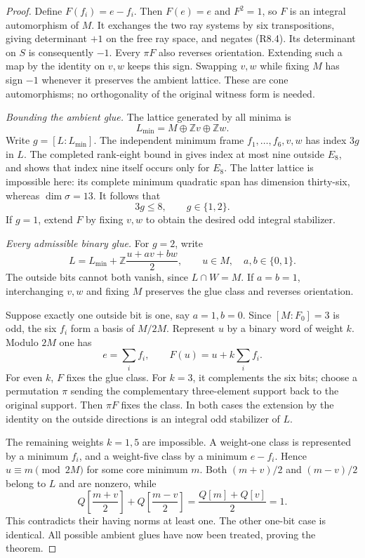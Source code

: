 \documentclass[11pt,a4paper]{article}
\theoremstyle{definition}
\begin{document}
\begin{proof}
Define $F(f_i)=e-f_i$. Then $F(e)=e$ and $F^2=1$, so $F$ is an
integral automorphism of $M$. It exchanges the two ray systems by
six transpositions, giving determinant $+1$ on the free ray space,
and negates (R8.4). Its determinant on $S$ is consequently $-1$.
Every $\pi F$ also reverses orientation. Extending such a map by
the identity on $v,w$ keeps this sign. Swapping $v,w$ while fixing
$M$ has sign $-1$ whenever it preserves the ambient lattice.
These are cone automorphisms; no orthogonality of the original
witness form is needed.

\medskip\noindent
\emph{Bounding the ambient glue.}
The lattice generated by all minima is
\[
                  L_{\min}=M\oplus\mathbb Zv\oplus\mathbb Zw.
\]
Write $g=[L:L_{\min}]$. The independent minimum frame
$f_1,\ldots,f_6,v,w$ has index $3g$ in $L$.
The completed rank-eight bound in
\cite[appendix, pp.~6--8]{MartinetIndexErrata2014} gives index at
most nine outside $E_8$, and
\cite[Theorem~10.1]{MartinetIndex2001} shows that index nine itself
occurs only for $E_8$. The latter lattice is impossible here: its
complete minimum quadratic span has dimension thirty-six, whereas
$\dim\sigma=13$. It follows that
\[
                           3g\leq8,
                  \qquad g\in\{1,2\}.                  \tag{R8.5}
\]
If $g=1$, extend $F$ by fixing $v,w$ to obtain the desired odd
integral stabilizer.

\medskip\noindent
\emph{Every admissible binary glue.}
For $g=2$, write
\[
 L=L_{\min}+\mathbb Z\frac{u+av+bw}{2},
       \qquad u\in M,\quad a,b\in\{0,1\}.
\]
The outside bits cannot both vanish, since $L\cap W=M$.
If $a=b=1$, interchanging $v,w$ and fixing $M$ preserves the
glue class and reverses orientation.

Suppose exactly one outside bit is one, say $a=1,b=0$.
Since $[M:F_0]=3$ is odd, the six $f_i$ form a basis of $M/2M$.
Represent $u$ by a binary word of weight $k$. Modulo $2M$ one has
\[
 e=\sum_i f_i,
 \qquad F(u)=u+k\sum_i f_i.
\]
For even $k$, $F$ fixes the glue class. For $k=3$, it complements
the six bits; choose a permutation $\pi$ sending the complementary
three-element support back to the original support. Then $\pi F$
fixes the class. In both cases the extension by the identity on the
outside directions is an integral odd stabilizer of $L$.

The remaining weights $k=1,5$ are impossible. A weight-one class
is represented by a minimum $f_i$, and a weight-five class by a
minimum $e-f_i$. Hence $u\equiv m\pmod{2M}$ for some core minimum
$m$. Both $(m+v)/2$ and $(m-v)/2$ belong to $L$ and are nonzero,
while
\[
 Q\!\left[\frac{m+v}{2}\right]
 +Q\!\left[\frac{m-v}{2}\right]
       =\frac{Q[m]+Q[v]}2=1.
\]
This contradicts their having norms at least one. The other
one-bit case is identical. All possible ambient glues have now
been treated, proving the theorem.
\end{proof}
\end{document}
